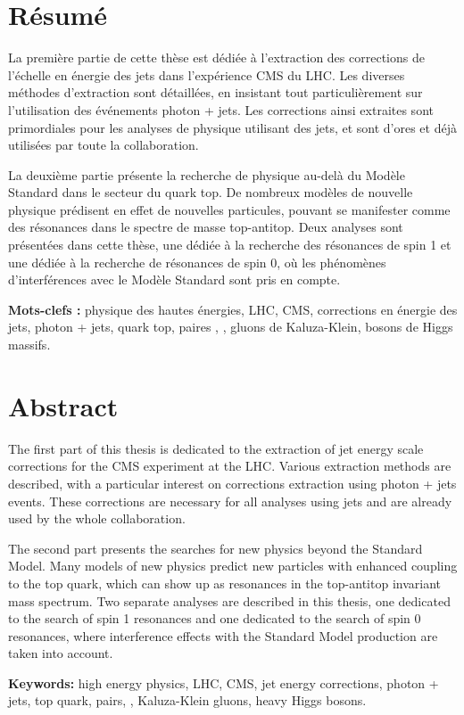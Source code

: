 \begingroup
\let\clearpage\relax
\let\cleardoublepage\relax
\let\cleardoublepage\relax

\chapter*{Résumé}

La première partie de cette thèse est dédiée à l'extraction des corrections de l'échelle en énergie des jets dans l'expérience CMS du LHC. Les diverses méthodes d'extraction sont détaillées, en insistant tout particulièrement sur l'utilisation des événements photon + jets. Les corrections ainsi extraites sont primordiales pour les analyses de physique utilisant des jets, et sont d'ores et déjà utilisées par toute la collaboration.

La deuxième partie présente la recherche de physique au-delà du Modèle Standard dans le secteur du quark top. De nombreux modèles de nouvelle physique prédisent en effet de nouvelles particules, pouvant se manifester comme des résonances dans le spectre de masse top-antitop. Deux analyses sont présentées dans cette thèse, une dédiée à la recherche des résonances de spin 1 et une dédiée à la recherche de résonances de spin 0, où les phénomènes d'interférences avec le Modèle Standard sont pris en compte.

\medskip

\textbf{Mots-clefs : } physique des hautes énergies, LHC, CMS, corrections en énergie des jets, photon + jets, quark top, paires \ttbar, \zprime, gluons de Kaluza-Klein, bosons de Higgs massifs.

\vfill

\chapter*{Abstract}

The first part of this thesis is dedicated to the extraction of jet energy scale corrections for the CMS experiment at the LHC. Various extraction methods are described, with a particular interest on corrections extraction using photon + jets events. These corrections are necessary for all analyses using jets and are already used by the whole collaboration.

The second part presents the searches for new physics beyond the Standard Model. Many models of new physics predict new particles with enhanced coupling to the top quark, which can show up as resonances in the top-antitop invariant mass spectrum. Two separate analyses are described in this thesis, one dedicated to the search of spin 1 resonances and one dedicated to the search of spin 0 resonances, where interference effects with the Standard Model production are taken into account.

\medskip

\textbf{Keywords: } high energy physics, LHC, CMS, jet energy corrections, photon + jets, top quark, \ttbar pairs, \zprime, Kaluza-Klein gluons, heavy Higgs bosons.

\endgroup

\vfill